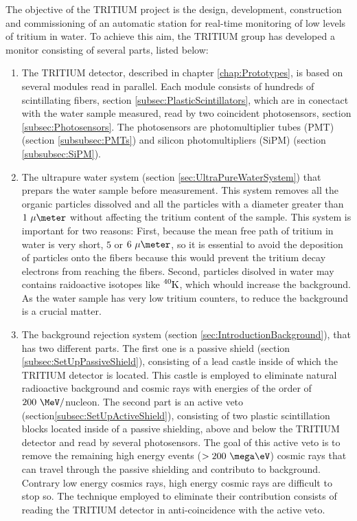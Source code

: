 The objective of the TRITIUM project is the design, development, construction and commissioning of an automatic station for real-time monitoring of low levels of tritium in water. To achieve this aim, the TRITIUM group has developed a monitor consisting of several parts, listed below: 

\begin{enumerate}

\item{} The TRITIUM detector, described in chapter \ref{chap:Prototypes}, is based on several modules read in parallel. Each module consists of hundreds of scintillating fibers, section \ref{subsec:PlasticScintillators}, which are in conectact with the water sample measured, read by two coincident photosensors, section \ref{subsec:Photosensors}. The photosensors are photomultiplier tubes (PMT) (section \ref{subsubsec:PMTs}) and silicon photomultipliers (SiPM) (section \ref{subsubsec:SiPM}).

\item{} The ultrapure water system (section \ref{sec:UltraPureWaterSystem}) that prepars the water sample before measurement. This system removes all the organic particles dissolved and all the particles with a diameter greater than $1~\mu\meter$ without affecting the tritium content of the sample. This system is important for two reasons: First, because the mean free path of tritium in water is very short, $5$ or $6~\mu\meter$,  so it is essential to avoid the deposition of particles onto the fibers because this would prevent the tritium decay electrons from reaching the fibers. Second, particles disolved in water may contains raidoactive isotopes like $\ce{^{40}K}$, which whould increase the background. As the water sample has very low tritium counters, to reduce the background is a crucial matter.

\item{} The background rejection system (section \ref{sec:IntroductionBackground}), that has two different parts. The first one is a passive shield (section \ref{subsec:SetUpPassiveShield}), consisting of a lead castle inside of which the TRITIUM detector is located. This castle is employed to eliminate natural radioactive background and cosmic rays with energies of the order of $200~\MeV/$nucleon. The second part is an active veto (section\ref{subsec:SetUpActiveShield}), consisting of two plastic scintillation blocks located inside of a passive shielding, above and below the TRITIUM detector and read by several photosensors. The goal of this active veto is to remove the remaining high energy events ($>200~\mega\eV$) cosmic rays that can travel through the passive shielding and contributo to background. Contrary low energy cosmics rays, high energy cosmic rays are difficult to stop so. The technique employed to eliminate their contribution consists of reading the TRITIUM detector in anti-coincidence with the active veto.


\end{enumerate}
